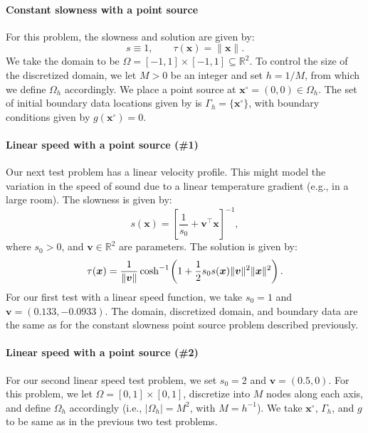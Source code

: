 \documentclass{siamart190516}
\newcommand{\m}[1]{\boldsymbol{#1}}
\begin{document}
\paragraph{Constant slowness with a point source} For this problem, the slowness and solution are given by:
\begin{equation}
  s \equiv 1, \qquad \tau(\m{x}) = \|\m{x}\|.
\end{equation}
We take the domain to be
$\Omega = [-1, 1] \times [-1, 1] \subseteq \mathbb{R}^2$. To control
the size of the discretized domain, we let $M > 0$ be an integer and
set $h = 1/M$, from which we define $\Omega_h$ accordingly. We place a
point source at $\m{x}^\circ = (0, 0) \in \Omega_h$. The set of
initial boundary data locations given by is
$\Gamma_h = \{\m{x}^\circ\}$, with boundary conditions given by
$g(\m{x}^\circ) = 0$.

\paragraph{Linear speed with a point source (\#1)} Our next test
problem has a linear velocity profile. This might model the variation
in the speed of sound due to a linear temperature gradient (e.g., in a
large room). The slowness is given by:
\begin{equation}
  s(\m{x}) = \left[\frac{1}{s_0} + \m{v}^\top \m{x}\right]^{-1},
\end{equation}
where $s_0 > 0$, and $\m{v} \in \mathbb{R}^2$ are parameters. The
solution is given by:
\begin{equation}\label{eq:eikonal-linear-speed}
  \tau(\m{x}) = \frac{1}{\|\m{v}\|} \cosh^{-1}\hspace{-0.1em}\left(1 + \frac{1}{2} s_0 s(\m{x}) \|\m{v}\|^2 \|\m{x}\|^2\right).
\end{equation}
For our first test with a linear speed function, we take $s_0 = 1$ and
$\m{v} = (0.133, -0.0933)$. The domain, discretized domain, and
boundary data are the same as for the constant slowness point source
problem described previously.

\paragraph{Linear speed with a point source (\#2)} For our second
linear speed test problem, we set $s_0 = 2$ and $\m{v} = (0.5,
0)$. For this problem, we let $\Omega = [0, 1] \times [0, 1]$,
discretize into $M$ nodes along each axis, and define $\Omega_h$
accordingly (i.e., $|\Omega_h| = M^2$, with $M = h^{-1}$). We take
$\m{x}^\circ$, $\Gamma_h$, and $g$ to be same as in the previous two
test problems.
\end{document}
